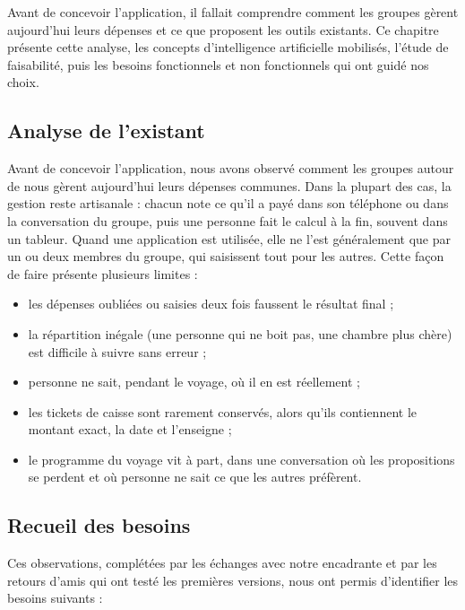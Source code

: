 
Avant de concevoir l'application, il fallait comprendre comment les groupes gèrent
aujourd'hui leurs dépenses et ce que proposent les outils existants. Ce chapitre présente
cette analyse, les concepts d'intelligence artificielle mobilisés, l'étude de faisabilité,
puis les besoins fonctionnels et non fonctionnels qui ont guidé nos choix.

\subsection{Analyse de l'existant}

Avant de concevoir l'application, nous avons observé comment les groupes autour de nous
gèrent aujourd'hui leurs dépenses communes. Dans la plupart des cas, la gestion reste
artisanale : chacun note ce qu'il a payé dans son téléphone ou dans la conversation du
groupe, puis une personne fait le calcul à la fin, souvent dans un tableur. Quand une
application est utilisée, elle ne l'est généralement que par un ou deux membres du groupe,
qui saisissent tout pour les autres. Cette façon de faire présente plusieurs limites :

\begin{itemize}
  \item les dépenses oubliées ou saisies deux fois faussent le résultat final ;
  \item la répartition inégale (une personne qui ne boit pas, une chambre plus chère) est
        difficile à suivre sans erreur ;
  \item personne ne sait, pendant le voyage, où il en est réellement ;
  \item les tickets de caisse sont rarement conservés, alors qu'ils contiennent le montant
        exact, la date et l'enseigne ;
  \item le programme du voyage vit à part, dans une conversation où les propositions se
        perdent et où personne ne sait ce que les autres préfèrent.
\end{itemize}

\subsection{Recueil des besoins}

Ces observations, complétées par les échanges avec notre encadrante et par les retours
d'amis qui ont testé les premières versions, nous ont permis d'identifier les besoins
suivants :

